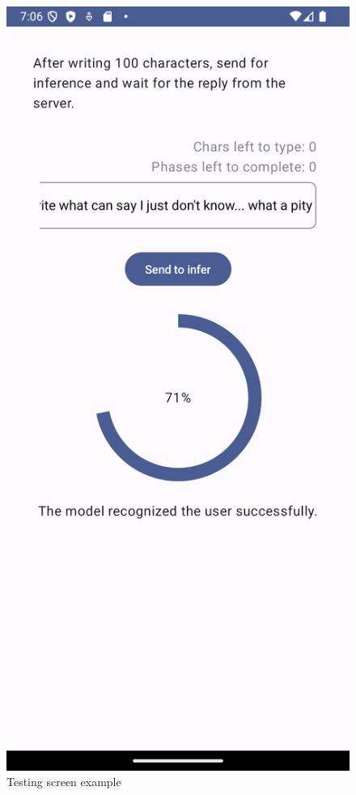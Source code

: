 \begin{figure}[H]
	\centering
	\includegraphics[width=0.32\linewidth]{images/testing_screen_example.png}
	\caption{Testing screen example}
	\label{fig:testing_screen_example}
\end{figure}

